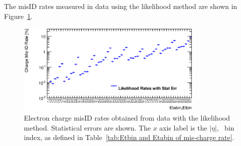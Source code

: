 %



The misID rates measured in data using the likelihood method are shown in Figure~\ref{fig:LL_Rates_Egamma}.

%



\begin{figure}[htp]
\centering
\includegraphics[width=0.8\textwidth]{figures/ChargeMisID/Egamma_LLB_new.eps}
\caption{Electron charge misID rates obtained from data with the likelihood method. Statistical errors are shown. The $x$ axis label is
  the $|\eta|$, \pt\ bin index, as defined in Table~\ref{tab:Etbin and Etabin of mis-charge rate}.}

\label{fig:LL_Rates_Egamma}
\end{figure}


